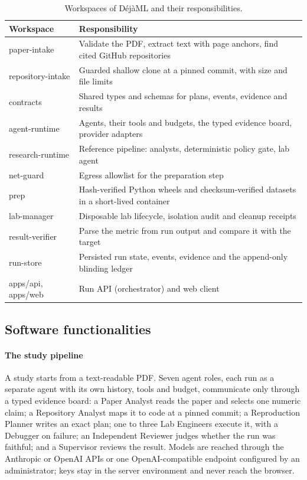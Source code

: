 \documentclass[preprint,12pt]{elsarticle}
\newcommand{\dejaml}{D\'ej\`aML}
\begin{document}
\begin{table}[!htbp]
\centering
\small
\caption{Workspaces of \dejaml{} and their responsibilities.}
\label{tab:packages}
\begin{tabularx}{\linewidth}{@{}>{\ttfamily}lX@{}}
\toprule
\normalfont Workspace & Responsibility \\
\midrule
paper-intake & Validate the PDF, extract text with page anchors, find cited GitHub repositories \\
repository-intake & Guarded shallow clone at a pinned commit, with size and file limits \\
contracts & Shared types and schemas for plans, events, evidence and results \\
agent-runtime & Agents, their tools and budgets, the typed evidence board, provider adapters \\
research-runtime & Reference pipeline: analysts, deterministic policy gate, lab agent \\
net-guard & Egress allowlist for the preparation step \\
prep & Hash-verified Python wheels and checksum-verified datasets in a short-lived container \\
lab-manager & Disposable lab lifecycle, isolation audit and cleanup receipts \\
result-verifier & Parse the metric from run output and compare it with the target \\
run-store & Persisted run state, events, evidence and the append-only blinding ledger \\
apps/api, apps/web & Run API (orchestrator) and web client \\
\bottomrule
\end{tabularx}
\end{table}

\subsection{Software functionalities}

\paragraph{The study pipeline}
A study starts from a text-readable PDF. Seven agent roles, each run as a
separate agent with its own
history, tools and budget, communicate only through a typed evidence board: a
Paper Analyst reads the paper and selects one numeric claim; a Repository
Analyst maps it to code at a pinned commit; a Reproduction Planner writes an
exact plan; one to three Lab Engineers execute it, with a Debugger on failure;
an Independent Reviewer judges whether the run was faithful; and a Supervisor
reviews the result. Models are reached through the Anthropic or OpenAI APIs or
one OpenAI-compatible endpoint configured by an administrator; keys stay in the
server environment and never reach the browser.
\end{document}
